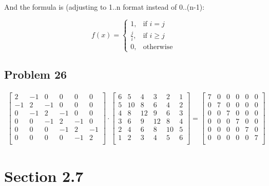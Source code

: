 \documentclass[a4paper,11pt]{article}
\begin{document}
And the formula is (adjusting to 1..n format instead of 0..(n-1):

\[
    f(x)= 
\begin{cases}
    1,& \text{if } i = j\\
    \frac{j}{i},& \text{if } i\ge j\\
    0,              & \text{otherwise}
\end{cases}
\]

\subsection*{Problem 26}
\begin{align}
\begin{bmatrix}
2  & -1 & 0  &  0  & 0  & 0\\
-1 & 2  & -1 &  0  & 0  & 0\\
0  & -1 & 2  &  -1 & 0  & 0\\
0  & 0  & -1 &  2  & -1 & 0\\
0  & 0  & 0  &  -1 & 2  & -1\\
0  & 0  & 0  &  0  & -1 & 2\\
\end{bmatrix}
\cdot
\begin{bmatrix}
6 &  5 &  4 &  3 & 2  & 1\\
5 & 10 &  8 &  6 & 4  & 2\\
4 &  8 & 12 &  9 & 6  & 3\\
3 &  6 &  9 & 12 & 8  & 4\\
2 &  4 &  6 &  8 & 10 & 5\\
1 &  2 &  3 &  4 & 5  & 6\\
\end{bmatrix}
=
\begin{bmatrix}
7 & 0 & 0 & 0 & 0 & 0\\
0 & 7 & 0 & 0 & 0 & 0\\
0 & 0 & 7 & 0 & 0 & 0\\
0 & 0 & 0 & 7 & 0 & 0\\
0 & 0 & 0 & 0 & 7 & 0\\
0 & 0 & 0 & 0 & 0 & 7\\
\end{bmatrix}
\end{align}

\section*{Section 2.7}
\end{document}
